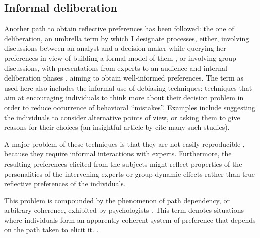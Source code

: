 \documentclass[version=last, pagesize, twoside=off, bibliography=totoc, DIV=calc, fontsize=12pt, a4paper, french, english]{scrartcl}
\begin{document}
\subsection{Informal deliberation}
\label{sec:informal}
Another path to obtain reflective preferences has been followed: the one of deliberation, an umbrella term by which I designate processes, either, involving discussions between an analyst and a decision-maker while querying her preferences in view of building a formal model of them \citep{raiffa_back_1985, keeney_decisions_1993, roy_multicriteria_1996, belton_multiple_2002}, or involving group discussions, with presentations from experts to an audience and internal deliberation phases \citep{fishkin_when_2011, chappell_deliberative_2012}, aiming to obtain well-informed preferences. 
The term as used here also includes the informal use of debiasing techniques: techniques that aim at encouraging individuals to think more about their decision problem in order to reduce occurrence of behavioral “mistakes”. Examples include suggesting the individuals to consider alternative points of view, or asking them to give reasons for their choices (an insightful article by \citet{mitchell_libertarian_2004} cite many such studies). 

A major problem of these techniques is that they are not easily reproducible , because they require informal interactions with experts. Furthermore, the resulting preferences elicited from the subjects might reflect properties of the personalities of the intervening experts or group-dynamic effects rather than true reflective preferences of the individuals. 

This problem is compounded by the phenomenon of path dependency, or arbitrary coherence, exhibited by psychologists \citep{ariely_predictably_2010}.  This term denotes situations where individuals form an apparently coherent system of preference that depends on the path taken to elicit it. 
. 
\end{document}
